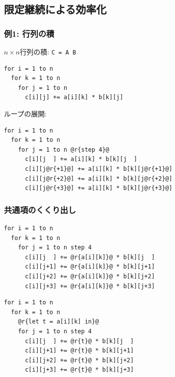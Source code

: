 \documentclass[dvipdfmx,cjk,xcolor=dvipsnames,envcountsect,notheorems,12pt]{beamer}
\theoremstyle{definition}
\begin{document}





\subsection{限定継続による効率化}

\begin{frame}[fragile]
  \frametitle{例1: 行列の積}
  $n \times n$行列の積: \lstinline|C = A B|
\begin{lstlisting}
for i = 1 to n
  for k = 1 to n
    for j = 1 to n
      c[i][j] += a[i][k] * b[k][j]
\end{lstlisting}
  \pause
  ループの展開:
\begin{lstlisting}
for i = 1 to n
  for k = 1 to n
    for j = 1 to n @r{step 4}@
      c[i][j  ] += a[i][k] * b[k][j  ]
      c[i][j@r{+1}@] += a[i][k] * b[k][j@r{+1}@]
      c[i][j@r{+2}@] += a[i][k] * b[k][j@r{+2}@]
      c[i][j@r{+3}@] += a[i][k] * b[k][j@r{+3}@]
\end{lstlisting}
\end{frame}

\begin{frame}[fragile]
  \frametitle{共通項のくくり出し}
\begin{lstlisting}
for i = 1 to n
  for k = 1 to n
    for j = 1 to n step 4
      c[i][j  ] += @r{a[i][k]}@ * b[k][j  ]
      c[i][j+1] += @r{a[i][k]}@ * b[k][j+1]
      c[i][j+2] += @r{a[i][k]}@ * b[k][j+2]
      c[i][j+3] += @r{a[i][k]}@ * b[k][j+3]
\end{lstlisting}
  \pause
\begin{lstlisting}
for i = 1 to n
  for k = 1 to n
    @r{let t = a[i][k] in}@
    for j = 1 to n step 4
      c[i][j  ] += @r{t}@ * b[k][j  ]
      c[i][j+1] += @r{t}@ * b[k][j+1]
      c[i][j+2] += @r{t}@ * b[k][j+2]
      c[i][j+3] += @r{t}@ * b[k][j+3]
\end{lstlisting}
\end{frame}
\end{document}

